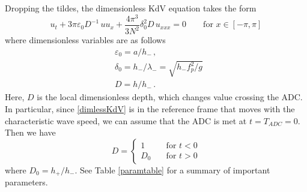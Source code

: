 \documentclass[11pt]{article}
\newcommand{\eps}{\varepsilon}
\newcommand{\depth}{h}
\newcommand{\dup}{\depth_{-}}
\newcommand{\ddn}{\depth_{+}}
\newcommand{\freqp}{f_p}
\newcommand{\lam}{\lambda}
\newcommand{\lamup}{\lam_{-}}
\newcommand{\lamfac}{N}
\newcommand{\amp}{a}
\newcommand{\epsup}{\eps_0}
\newcommand{\delup}{\delta_0}
\newcommand{\drat}{D}
\newcommand{\dratdn}{\drat_0}
\begin{document}
\begin{comment}
Old Note (around May 2019): After giving it some deliberation, I believe we should use $\lamfac=1$. My reason is that the peak in the wave spectrum occurs at a frequency of $\freqp$ or wavelength of $\lam$. In the tKdV Gibbs measure, the spectrum decays monotonically, so that the peak is at the lowest resolved frequency (or largest resolved wavelength). Thus, we want $\lam$ to correspond to the largest resolved wavelength, i.e.~the length of the periodic domain in the tKdV framework.

New Thought (July 2019): Actually, it is very possible that the bandwidth (2 Hz in the experiments) sets the value of $\lamfac$ that is most appropriate, since that bandwidth sets the decay rate of the spectrum. My thinking is that our experimental forcing does not really follow the upstream Gibbs measure all that well (because we did not have that in mind), but perhaps it best approximates the tail decay of some Gibbs measure. Perhaps, the lowest frequencies (i.e. those much slower than 2 Hz that are present in the theory but almost absent in the experiments) do not affect statistics that much.
\end{comment}

Dropping the tildes, the dimensionless KdV equation takes the form
\begin{equation}
\label{dimlessKdV}
u_t + {3 \pi} \epsup \drat^{-1} \, u u_x + \frac{4 \pi^3}{3 \lamfac^2} \delup^2 \drat \, u_{xxx} = 0
\qquad \text{for } x \in [-\pi,\pi]
\end{equation}
where dimensionless variables are as follows
\begin{align}
&\epsup = \amp/\dup \, , \\
&\delup = \dup/\lamup = \sqrt{\dup \freqp^2/g} \, \\
&\drat = {\depth}/{\dup} \, .
\end{align}
Here, $\drat$ is the local dimensionless depth, which changes value crossing the ADC. In particular, since \eqref{dimlessKdV} is in the reference frame that moves with the characteristic wave speed, we can assume that the ADC is met at $t = T_{ADC} = 0$. Then we have
\begin{equation}
\drat = 
\begin{cases}
1 		&\quad \mbox{for } t<0 \\
\dratdn 	&\quad \mbox{for } t>0
\end{cases}
\end{equation}
where $\dratdn = \ddn/\dup$.
See Table \ref{paramtable} for a summary of important parameters.
\end{document}
